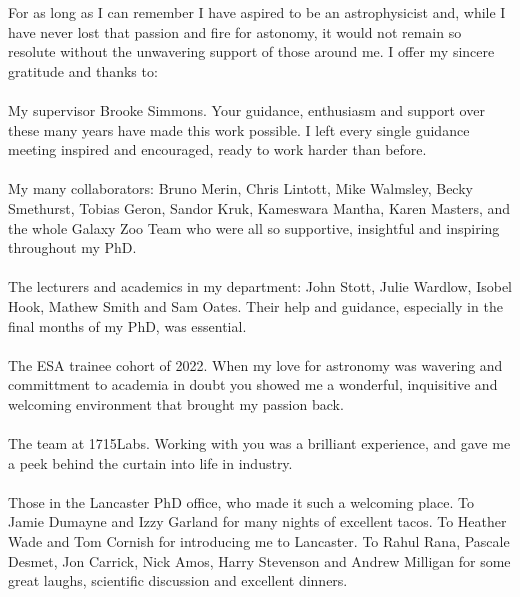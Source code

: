 

\begin{acknowledgements}      %
For as long as I can remember I have aspired to be an astrophysicist and, while I have never lost that passion and fire for astonomy, it would not remain so resolute without the unwavering support of those around me. I offer my sincere gratitude and thanks to:
\\
\\
My supervisor Brooke Simmons. Your guidance, enthusiasm and support over these many years have made this work possible. I left every single guidance meeting inspired and encouraged, ready to work harder than before.
\\
\\
My many collaborators: Bruno Merin, Chris Lintott, Mike Walmsley, Becky Smethurst, Tobias Geron, Sandor Kruk, Kameswara Mantha, Karen Masters, and the whole Galaxy Zoo Team who were all so supportive, insightful and inspiring throughout my PhD. 
\\
\\
The lecturers and academics in my department: John Stott, Julie Wardlow, Isobel Hook, Mathew Smith and Sam Oates. Their help and guidance, especially in the final months of my PhD, was essential.
\\
\\
The ESA trainee cohort of 2022. When my love for astronomy was wavering and committment to academia in doubt you showed me a wonderful, inquisitive and welcoming environment that brought my passion back.
\\
\\
The team at 1715Labs. Working with you was a brilliant experience, and gave me a peek behind the curtain into life in industry.
\\
\\
Those in the Lancaster PhD office, who made it such a welcoming place. To Jamie Dumayne and Izzy Garland for many nights of excellent tacos. To Heather Wade and Tom Cornish for introducing me to Lancaster. To Rahul Rana, Pascale Desmet, Jon Carrick, Nick Amos, Harry Stevenson and Andrew Milligan for some great laughs, scientific discussion and excellent dinners.
\\

\end{acknowledgements}
